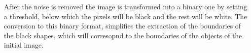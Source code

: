 After the noise is removed the image is transformed into a binary one by setting a threshold, below which the pixels will be black and the rest will be white. The conversion to this binary format, simplifies the extraction of the boundaries of the black shapes, which will corresopnd to the boundaries of the objects of the initial image.

